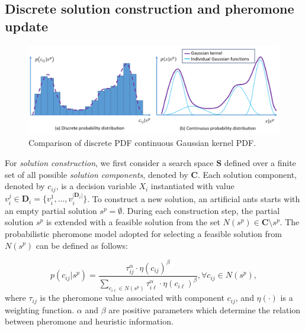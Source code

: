 \subsection{Discrete solution construction and pheromone update}

\begin{figure}
\centering
\includegraphics[width=\textwidth]{ACOR_gaussianKernel}
\caption{Comparison of discrete PDF continuous Gaussian kernel PDF.}\label{fig:ACOR_gaussianKernel}
\end{figure}


For \textit{solution construction}, 
we first consider a search space $\boldsymbol{S}$ defined over a finite set of all possible \textit{solution components}, 
denoted by $\boldsymbol{C}$.
Each solution component, denoted by $c_{ij}$, is a decision variable $X_i$ instantiated with value $v^{j}_{i} \in \boldsymbol{D}_i = \{ v^{1}_{i}, ..., v^{|\boldsymbol{D}_i|}_{i}\}$.
To construct a new solution, an artificial ants starts with an empty partial solution $s^{p} = \emptyset$.
During each construction step, the partial solution $s^{p}$ is extended with a feasible solution from the set $N(s^{p}) \in \boldsymbol{C} \setminus s^{p}$.
The probabilistic pheromone model adopted for selecting a feasible solution from $N(s^{p})$ can be defined as follows:

\begin{displaymath}
p(c_{ij}|s^p) = \frac{\tau^{\alpha}_{ij} \cdot \eta(c_{ij})^{\beta}} 
                     {\sum_{c_{i\ell}\in N(s^{p})} \tau^{\alpha}_{i\ell} \cdot \eta(c_{i\ell})^{\beta} },  \forall c_{ij} \in N(s^{p}),
\end{displaymath}
where $\tau_{ij}$ is the pheromone value associated with component $c_{ij}$, and $\eta(\cdot)$ is a weighting function. 
$\alpha$ and $\beta$ are positive parameters which determine the relation between pheromone and heuristic information.

